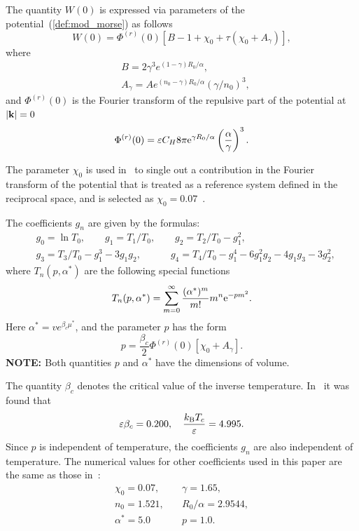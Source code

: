 \documentclass[12pt]{article}
\begin{document}
	The quantity $W(0)$ is expressed via parameters of the potential~(\ref{def:mod_morse}) as follows
	\begin{equation}
	W(0) = \Phi^{(r)}(0) \left[ B - 1 + \chi_0 + \tau (\chi_0 + A_\gamma) \right],
	\end{equation}
	where
	\begin{align*} 
		& B = 2 \gamma^3 e^{(1-\gamma)R_0/\alpha},
		\nonumber \\
		& A_\gamma = A e^{(n_0-\gamma)R_0/\alpha} \left( \gamma / n_0\right)^3, 
	\end{align*}
	and $\Phi^{(r)}(0)$ is the Fourier transform of the repulsive part of the potential at $\abs{\vb k}=0$
	\begin{equation*}
		\Phi^{(r)}(0) = \varepsilon C_H 8\pi {\rm e}^{\gamma R_0/\alpha} \left(\frac{\alpha}{\gamma}\right)^3.
	\end{equation*}
	
	The parameter $\chi_0$ is used in~\cite{KozlovskiiDobush2020} to single out a contribution in the Fourier transform of the potential that is treated as a reference system defined in the reciprocal space, and is selected as $\chi_0 = 0.07$~\cite[see Eq.(24)]{KozlovskiiDobush2020}.
	
	The coefficients $g_n$ are given by the formulas:
	\begin{align}
		& g_0 = \ln T_0, \qquad g_1 = T_1/T_0, \qquad g_2 = T_2/T_0 - g_1^2,  \nonumber \\
		& g_3 = T_3/T_0 - g_1^3 - 3g_1 g_2, \quad \qquad  g_4 = T_4/T_0 - g_1^4 - 6 g_1^2 g_2 - 4 g_1 g_3 - 3 g_2^2, 
	\end{align}
	where $T_n(p,\alpha^*)$ are the following special functions
	\begin{equation}
		T_n(p,\alpha^*) = \sum_{m=0}^{\infty} \frac{(\alpha^*)^m}{m!} m^n {\rm e}^{-pm^2}.
	\end{equation}
	Here $\alpha^*=v e^{\beta_c\mu^*}$, and the parameter $p$ has the form
	\begin{equation}
		p = \frac{\beta_c}{2} \Phi^{(r)}(0) [\chi_0 + A_\gamma].
	\end{equation} 
	{\color{Red} {\bf{NOTE: }} Both quantities $p$ and $\alpha^*$ have the dimensions of volume. }
	
	The quantity $\beta_c$ denotes the critical value of the inverse temperature. In~\cite[see Eq.(31)]{KozlovskiiDobush2020} it was found that
	\begin{equation*}
		\varepsilon\beta_c = 0.200, \quad \frac{k_{\rm B} T_c}{\varepsilon} = 4.995.
	\end{equation*}
	Since $p$ is independent of temperature, the coefficients $g_n$ are also independent of temperature. The numerical values for other coefficients used in this paper are the same as those in~\cite[see Eqs.(5), (23), and (24)]{KozlovskiiDobush2020}:
	\begin{eqnarray*}
		\chi_0 = 0.07, & \quad \gamma = 1.65, \\
		n_0 = 1.521, & \quad R_0/\alpha = 2.9544, \\
		\alpha^* = 5.0 & \quad p = 1.0.
	\end{eqnarray*}
	
\end{document}
